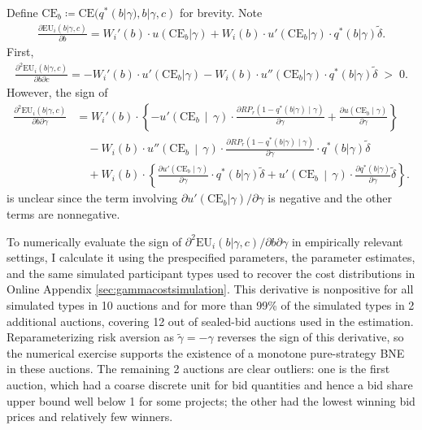 \documentclass[12pt]{article}
\theoremstyle{definition} %
\begin{document}
Define $\mathrm{CE}_b \coloneqq \mathrm{CE}(q^\ast(b|\gamma),b|\gamma,c)$ for brevity. Note
\begin{align*}
\frac{\partial \mathrm{EU}_i(b|\gamma,c)}{\partial b} 
= W_i'(b) \cdot u(\mathrm{CE}_b|\gamma) + W_i(b) \cdot u'(\mathrm{CE}_b|\gamma) \cdot q^\ast(b|\gamma) \tilde{\delta}.
\end{align*}
First,
\begin{align*}
\frac{\partial^2 \mathrm{EU}_i(b|\gamma,c)}{\partial b \partial c}
= - W_i'(b)\cdot u'\!\left(\mathrm{CE}_b|\gamma\right) - W_i(b)\cdot u''\!\left(\mathrm{CE}_b|\gamma\right) \cdot q^\ast(b|\gamma)\tilde{\delta} \;>\; 0 .
\end{align*}
However, the sign of
\begin{align*}
\frac{\partial^2 \mathrm{EU}_i(b|\gamma,c)}{\partial b \partial \gamma}
&= W_i'(b)\cdot \left\{-u'\!\left(\mathrm{CE}_b\,\middle|\,\gamma\right)
      \cdot \frac{\partial RP_r(1-q^\ast(b|\gamma)\mid\gamma)}{\partial \gamma} + \frac{\partial u(\mathrm{CE}_b\mid\gamma)}{\partial \gamma} \right\} \\
&\quad - W_i(b)\cdot u''\!\left(\mathrm{CE}_b\,\middle|\,\gamma\right)
      \cdot \frac{\partial RP_r(1-q^\ast(b|\gamma)\mid\gamma)}{\partial \gamma}
      \cdot q^\ast(b|\gamma)\tilde{\delta} \\
&\quad + W_i(b)\cdot \left\{\frac{\partial u'(\mathrm{CE}_b\mid\gamma)}{\partial \gamma}
      \cdot q^\ast(b|\gamma)\tilde{\delta} + u'\!\left(\mathrm{CE}_b\,\middle|\,\gamma\right)
      \cdot \frac{\partial q^\ast(b|\gamma)}{\partial \gamma}\tilde{\delta} \right\}.
\end{align*}
is unclear since the term involving $\partial u'(\mathrm{CE}_b|\gamma)/\partial \gamma$ is negative and the other terms are nonnegative.

To numerically evaluate the sign of $\partial^2 \mathrm{EU}_i(b|\gamma,c)/\partial b \partial \gamma$ in empirically relevant settings, I calculate it using the prespecified parameters, the parameter estimates, and the same simulated participant types used to recover the cost distributions in Online Appendix \ref{sec:gammacostsimulation}. This derivative is nonpositive for all simulated types in 10 auctions and for more than 99\% of the simulated types in 2 additional auctions, covering 12 out of  sealed-bid auctions used in the estimation. Reparameterizing risk aversion as $\tilde{\gamma} = -\gamma$ reverses the sign of this derivative, so the numerical exercise supports the existence of a monotone pure-strategy BNE in these auctions. The remaining 2 auctions are clear outliers: one is the first auction, which had a coarse discrete unit for bid quantities and hence a bid share upper bound well below 1 for some projects; the other had the lowest winning bid prices and relatively few winners.
\end{document}
